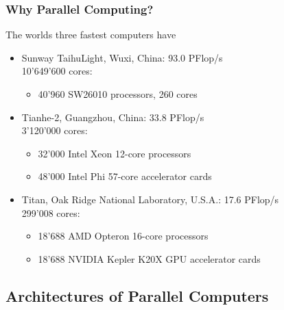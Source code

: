 \documentclass[aspectratio=169,11pt]{beamer}
\theoremstyle{definition}
\begin{document}
\begin{frame}
\frametitle<presentation>{Why Parallel Computing?}

The worlds three fastest computers have
\begin{itemize}
\item Sunway TaihuLight, Wuxi, China: 93.0 PFlop/s\\
10'649'600 cores:
\begin{itemize}
\item 40'960 SW26010 processors, 260 cores\\
\end{itemize}
\item Tianhe-2, Guangzhou, China: 33.8 PFlop/s\\
3'120'000 cores:
\begin{itemize}
\item 32'000 Intel Xeon 12-core processors
\item 48'000 Intel Phi 57-core accelerator cards
\end{itemize}
\item Titan, Oak Ridge National Laboratory, U.S.A.: 17.6 PFlop/s\\
299'008 cores:
\begin{itemize}
\item 18'688 AMD Opteron 16-core processors
\item 18'688 NVIDIA Kepler K20X GPU accelerator cards
\end{itemize}
\end{itemize}

\end{frame}

\subsection{Architectures of Parallel Computers}
\end{document}
